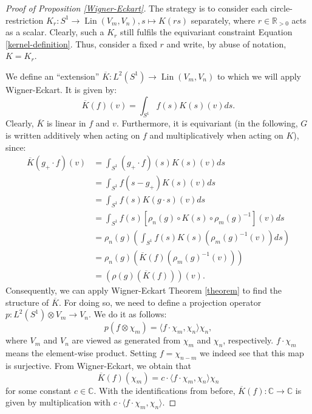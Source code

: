 \documentclass[12pt, a4paper]{article}
\theoremstyle{plain}
\theoremstyle{definition}
\theoremstyle{remark}
\newcommand{\C}{\mathds{C}}
\DeclareMathOperator{\lin}{Lin}
\begin{document}
\begin{proof}[Proof of Proposition \ref{Wigner-Eckart}]
The strategy is to consider each circle-restriction $K_r: S^1 \to \lin(V_m, V_n), s \mapsto K(rs)$ separately, where $r \in \mathbb{R}_{>0}$ acts as a scalar. Clearly, such a $K_r$ still fulfils the equivariant constraint Equation \ref{kernel-definition}. Thus, consider a fixed $r$ and write, by abuse of notation, $K = K_r$.

We define an ``extension'' $\overline{K}: L^2(S^1) \to \lin(V_m, V_{n})$ to which we will apply Wigner-Eckart. It is given by:
\begin{equation*}
\overline{K}(f)(v) = \int_{S^1}f(s)K(s)(v)ds.
\end{equation*}
Clearly, $\overline{K}$ is linear in $f$ and $v$. Furthermore, it is equivariant (in the following, $G$ is written additively when acting on $f$ and multiplicatively when acting on $K$), since:
\begin{align*}
\overline{K}(g_+ \cdot f)(v) & = \int_{S^1} (g_+\cdot f)(s) K(s)(v) ds \\
& = \int_{S^1} f(s - g_{+}) K(s)(v)ds \\
& = \int_{S^1} f(s) K(g\cdot s)(v)ds \\
& = \int_{S^1} f(s) \left[ \rho_{n}(g) \circ K(s) \circ \rho_m(g)^{-1}\right](v) ds  \\
& = \rho_n(g) \left( \int_{S^1} f(s) K(s) \left( \rho_m(g)^{-1}(v)\right)ds \right) \\
& = \rho_n(g) \left( \overline{K}(f)\left(\rho_m(g)^{-1}(v) \right)\right) \\
& = \left(\rho(g)\left( \overline{K}(f) \right)\right)(v).
\end{align*}
Consequently, we can apply Wigner-Eckart Theorem \ref{theorem} to find the structure of $\overline{K}$. For doing so, we need to define a projection operator $p: L^2(S^1) \otimes V_m \to V_n$. We do it as follows:
\begin{equation*}
p(f \otimes \chi_m) = \langle f \cdot \chi_m, \chi_n\rangle \chi_n,
\end{equation*}
where $V_m$ and $V_n$ are viewed as generated from $\chi_m$ and $\chi_n$, respectively. $f \cdot \chi_m$ means the element-wise product. Setting $f = \chi_{n-m}$ we indeed see that this map is surjective. From Wigner-Eckart, we obtain that
\begin{equation*}
\overline{K}(f)(\chi_m) = c \cdot \langle f \cdot \chi_m, \chi_n \rangle \chi_n
\end{equation*}
for some constant $c \in \C$. With the identifications from before, $\overline{K}(f): \C \to \C$ is given by multiplication with $c \cdot \langle f \cdot \chi_m, \chi_n \rangle$.


\end{proof}
\end{document}
